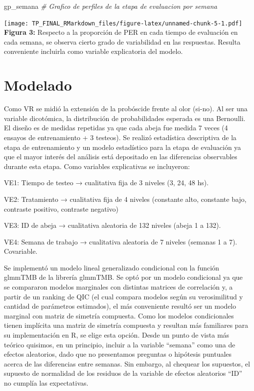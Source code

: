 \documentclass[]{article}
\newenvironment{Shaded}{\begin{snugshade}}{\end{snugshade}}
\newcommand{\CommentTok}[1]{\textcolor[rgb]{0.56,0.35,0.01}{\textit{#1}}}
\newcommand{\NormalTok}[1]{#1}
\begin{document}
\begin{Shaded}
\begin{Highlighting}[]
\NormalTok{gp_semana }\CommentTok{# Grafico de perfiles de la etapa de evaluacion por semana}
\end{Highlighting}
\end{Shaded}

\texttt{[image: TP\_FINAL\_RMarkdown\_files/figure-latex/unnamed-chunk-5-1.pdf]}
\textbf{Figura 3:} Respecto a la proporción de PER en cada tiempo de
evaluación en cada semana, se observa cierto grado de variabilidad en
las respuestas. Resulta conveniente incluirla como variable explicatoria
del modelo.

\hypertarget{modelado}{%
\section{Modelado}\label{modelado}}

Como VR se midió la extensión de la probóscide frente al olor (si-no).
Al ser una variable dicotómica, la distribución de probabilidades
esperada es una Bernoulli. El diseño es de medidas repetidas ya que cada
abeja fue medida 7 veces (4 ensayos de entrenamiento + 3 testeos). Se
realizó estadística descriptiva de la etapa de entrenamiento y un modelo
estadístico para la etapa de evaluación ya que el mayor interés del
análisis está depositado en las diferencias observables durante esta
etapa. Como variables explicativas se incluyeron:

VE1: Tiempo de testeo → cualitativa fija de 3 niveles (3, 24, 48 hs).

VE2: Tratamiento → cualitativa fija de 4 niveles (constante alto,
constante bajo, contraste positivo, contraste negativo)

VE3: ID de abeja → cualitativa aleatoria de 132 niveles (abeja 1 a 132).

VE4: Semana de trabajo → cualitativa aleatoria de 7 niveles (semanas 1 a
7). Covariable.

Se implementó un modelo lineal generalizado condicional con la función
glmmTMB de la librería glmmTMB. Se optó por un modelo condicional ya que
se compararon modelos marginales con distintas matrices de correlación
y, a partir de un ranking de QIC (el cual compara modelos según su
verosimilitud y cantidad de parámetros estimados), el más conveniente
resultó ser un modelo marginal con matriz de simetría compuesta. Como
los modelos condicionales tienen implícita una matriz de simetría
compuesta y resultan más familiares para su implementación en R, se
elige esta opción. Desde un punto de vista más teórico quisimos, en un
principio, incluir a la variable ``semana'' como una de efectos
aleatorios, dado que no presentamos preguntas o hipótesis puntuales
acerca de las diferencias entre semanas. Sin embargo, al chequear los
supuestos, el supuesto de normalidad de los residuos de la variable de
efectos aleatorios ``ID'' no cumplía las expectativas.
\end{document}
